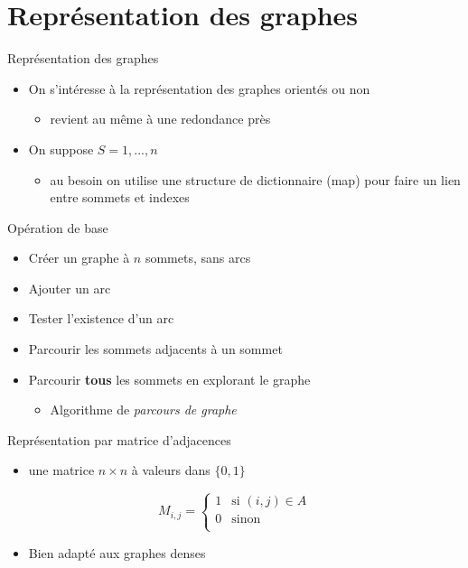 
\section{Représentation des graphes}

\begin{frame}{Représentation des graphes}
    \begin{itemize}
        \item On s'intéresse à la représentation des graphes orientés ou non
        \begin{itemize}
            \item revient au même à une redondance près
        \end{itemize}
        \item On suppose $S={1,...,n}$
        \begin{itemize}
            \item au besoin on utilise une structure de dictionnaire (map) pour faire un lien entre sommets et indexes
        \end{itemize}
    \end{itemize}
\end{frame}

\begin{frame}{Opération de base}
    \begin{itemize}
        \item Créer un graphe à $n$ sommets, sans arcs
        \item Ajouter un arc
        \item Tester l'existence d'un arc 
        \item Parcourir les sommets adjacents à un sommet 
        \item Parcourir \textbf{tous} les sommets en explorant le graphe
        \begin{itemize}
            \item Algorithme de \emph{parcours de graphe}
        \end{itemize}
    \end{itemize}
\end{frame}

\begin{frame}{Représentation par matrice d'adjacences}
    \begin{itemize}
        \item une matrice $n \times n$ à valeurs dans $\{0,1\}$
    \end{itemize}
    \begin{equation*}
        M_{i,j} = \left\{ 
            \begin{array}{ll}
                1 & \mbox{si } (i,j) \in A \\
                0 & \mbox{sinon} \\
            \end{array}
            \right.
        \end{equation*}
\begin{itemize}
    \item Bien adapté aux graphes denses 
\end{itemize}
\end{frame}

